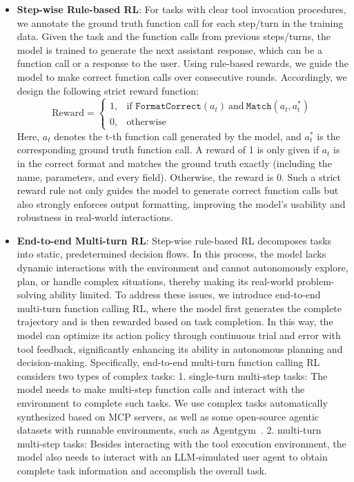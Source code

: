 \documentclass{article}
\theoremstyle{definition}
\begin{document}
\begin{itemize}[leftmargin=*,itemsep=0pt,topsep=0pt]
    \item \textbf{Step-wise Rule-based RL}: For tasks with clear tool invocation procedures, we annotate the ground truth function call for each step/turn in the training data. Given the task and the function calls from previous steps/turns, the model is trained to generate the next assistant response, which can be a function call or a response to the user. Using rule-based rewards, we guide the model to make correct function calls over consecutive rounds.
    Accordingly, we design the following strict reward function:
    $$\text{Reward} =
    \begin{cases}
    1, & \text{if } \texttt{FormatCorrect}(a_t)\ \text{and}\ \texttt{Match}(a_t, a_t^*) \\
    0, & \text{otherwise}
    \end{cases}$$
    Here, $a_t$ denotes the t-th function call generated by the model, and $a_t^*$ is the corresponding ground truth function call. A reward of 1 is only given if $a_t$ is in the correct format and matches the ground truth exactly (including the name, parameters, and every field). Otherwise, the reward is 0.
    Such a strict reward rule not only guides the model to generate correct function calls but also strongly enforces output formatting, improving the model’s usability and robustness in real-world interactions.
    \item \textbf{End-to-end Multi-turn RL}: Step-wise rule-based RL decomposes tasks into static, predetermined decision flows. In this process, the model lacks dynamic interactions with the environment and cannot autonomously explore, plan, or handle complex situations, thereby making its real-world problem-solving ability limited. To address these issues, we introduce end-to-end multi-turn function calling RL, where the model first generates the complete trajectory and is then rewarded based on task completion. In this way, the model can optimize its action policy through continuous trial and error with tool feedback, significantly enhancing its ability in autonomous planning and decision-making.
    Specifically, end-to-end multi-turn function calling RL considers two types of complex tasks: 1. single-turn multi-step tasks: The model needs to make multi-step function calls and interact with the environment to complete such tasks. We use complex tasks automatically synthesized based on MCP servers, as well as some open-source agentic datasets with runnable environments, such as Agentgym~\cite{xi2024agentgym}. 2. multi-turn multi-step tasks: Besides interacting with the tool execution environment, the model also needs to interact with an LLM-simulated user agent to obtain complete task information and accomplish the overall task.

\end{itemize}
\end{document}
